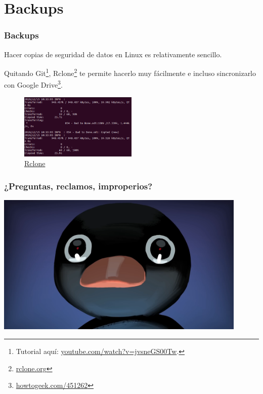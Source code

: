 \documentclass[aspectratio=43]{beamer}
\begin{document}
\section{Backups}

\begin{frame}
    \frametitle{Backups}
    
    Hacer copias de seguridad de datos en Linux es relativamente sencillo.\newline

    Quitando Git\footnote{Tutorial aquí: \href{https://www.youtube.com/watch?v=jvsneGS00Tw}{youtube.com/watch?v=jvsneGS00Tw}.}, Rclone\footnote{\href{https://rclone.org/}{rclone.org}} te permite hacerlo muy fácilmente e incluso sincronizarlo con Google Drive\footnote{\href{https://www.howtogeek.com/451262/how-to-use-rclone-to-back-up-to-google-drive-on-linux/}{howtogeek.com/451262}}.

    \begin{figure}
        \centering
        \includegraphics[width=0.5\textwidth]{img/rclone.png}
        \caption{\href{https://rclone.org/}{Rclone}}
    \end{figure}
\end{frame}



\begin{frame}
    \frametitle{¿Preguntas, reclamos, improperios?}
    \centering
    \includegraphics[width=0.9\textwidth]{img/noot.png}
\end{frame}
\end{document}
